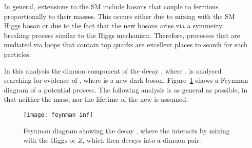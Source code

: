 
In general, extensions to the SM include bosons that couple to fermions proportionally to
their masses.
This occurs either due to mixing with the SM Higgs boson or due to the fact that the
new bosons arise via a symmetry breaking process similar to the Higgs mechanism.
Therefore, processes that are mediated via loops that contain top quarks are excellent places to
search for such particles.

In this analysis the dimuon component of the decay \btokstrmumu, where \kstartokpi, is analysed
searching for evidence of \dbtomumu, where \db is a new dark boson.
Figure~\ref{fig:feynman} shows a Feynman diagram of a potential process.
The following analysis is as general as possible, in that neither the mass, nor the lifetime of the
new \db is assumed.

\begin{figure}
  \begin{center}
    \texttt{[image: feynman\_inf]}
  \caption{\small
    Feynman diagram showing the decay \btokstrdb, where the \db interacts by mixing with the
    Higgs or $Z$, which then decays into a dimuon pair.
  }
  \label{fig:feynman}
\end{center}
\end{figure}

